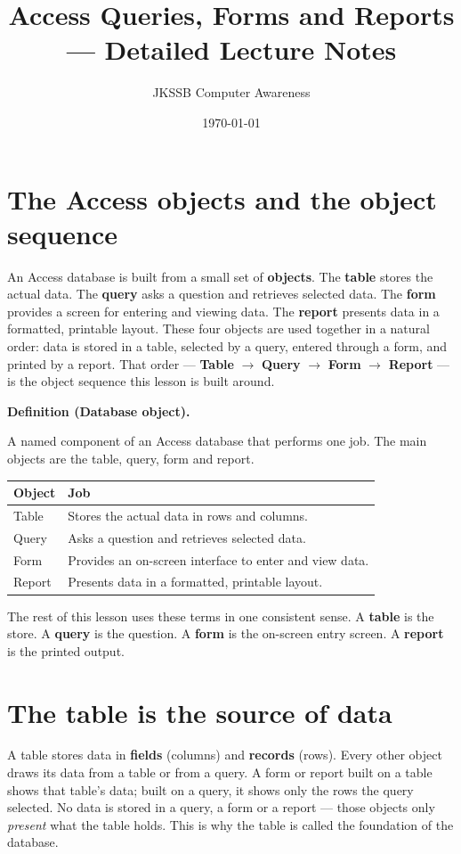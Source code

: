 \documentclass[11pt]{article}
\title{Access Queries, Forms and Reports --- Detailed Lecture Notes}
\author{JKSSB Computer Awareness}
\date{\today}
\newenvironment{definitionbox}[1]{%
  \par\noindent\textbf{Definition (#1).}\ \itshape
}{\par\vspace{0.3em}}
\begin{document}
\maketitle

\section{The Access objects and the object sequence}
An Access database is built from a small set of \textbf{objects}. The
\textbf{table} stores the actual data. The \textbf{query} asks a question
and retrieves selected data. The \textbf{form} provides a screen for
entering and viewing data. The \textbf{report} presents data in a formatted,
printable layout. These four objects are used together in a natural order:
data is stored in a table, selected by a query, entered through a form, and
printed by a report. That order --- \textbf{Table} $\rightarrow$
\textbf{Query} $\rightarrow$ \textbf{Form} $\rightarrow$ \textbf{Report}
--- is the object sequence this lesson is built around.

\begin{definitionbox}{Database object}
A named component of an Access database that performs one job. The main
objects are the table, query, form and report.
\end{definitionbox}

\begin{center}
\begin{tabular}{p{}p{}}
\toprule
\textbf{Object} & \textbf{Job} \\
\midrule
Table & Stores the actual data in rows and columns. \\
Query & Asks a question and retrieves selected data. \\
Form & Provides an on-screen interface to enter and view data. \\
Report & Presents data in a formatted, printable layout. \\
\bottomrule
\end{tabular}
\end{center}

The rest of this lesson uses these terms in one consistent sense. A
\textbf{table} is the store. A \textbf{query} is the question. A
\textbf{form} is the on-screen entry screen. A \textbf{report} is the printed
output.

\section{The table is the source of data}
A table stores data in \textbf{fields} (columns) and \textbf{records}
(rows). Every other object draws its data from a table or from a query. A
form or report built on a table shows that table's data; built on a query,
it shows only the rows the query selected. No data is stored in a query, a
form or a report --- those objects only \emph{present} what the table holds.
This is why the table is called the foundation of the database.
\end{document}
